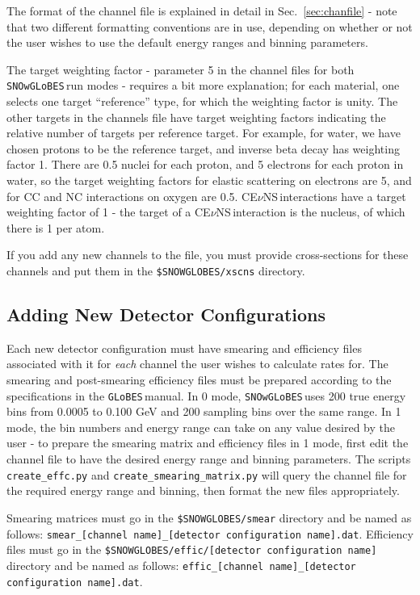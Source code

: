 \documentclass{article}
\newcommand{\cev}{CE$\nu$NS\,}
\newcommand{\snow}{\texttt{SNOwGLoBES}\,}
\newcommand{\glb}{\texttt{GLoBES}\,}
\begin{document}
The format of the channel file is explained in detail in Sec.~\ref{sec:chanfile} - note that two different formatting conventions are in use, depending on whether or not the user wishes to use the default energy ranges and binning parameters.

The target weighting factor - parameter 5 in the channel files for both \snow run modes - requires a bit more explanation; for each material, one selects one target ``reference'' type, for which the weighting factor is unity.  The other targets in the channels file have target weighting factors indicating the relative number of targets per reference target.  For example, for water, we have chosen protons to be the reference target, and inverse beta decay has weighting factor 1. There are 0.5  nuclei for each proton, and 5 electrons for each proton in water, so the target weighting factors for elastic scattering on electrons are 5, and for CC and NC interactions on oxygen are 0.5. \cev interactions have a target weighting factor of 1 - the target of a \cev interaction is the nucleus, of which there is 1 per atom.

If you add any new channels to the file, you must provide cross-sections for these channels and put them in the \texttt{\$SNOWGLOBES/xscns} directory.

\subsection{Adding New Detector Configurations}

Each new detector configuration must have smearing and efficiency files associated with it for \textit{each} channel the user wishes to calculate rates for. The smearing and post-smearing efficiency files must be prepared according to the specifications in the \glb manual. In 0 mode, \snow uses 200 true energy bins from 0.0005 to 0.100 GeV and 200 sampling bins over the same range. In 1 mode, the bin numbers and energy range can take on any value desired by the user - to prepare the smearing matrix and efficiency files in 1 mode, first edit the channel file to have the desired energy range and binning parameters. The scripts \texttt{create\_effc.py} and \texttt{create\_smearing\_matrix.py} will query the channel file for the required energy range and binning, then format the new files appropriately.

Smearing matrices must go in the \texttt{\$SNOWGLOBES/smear} directory and be named as follows: \texttt{smear\_[channel name]\_[detector configuration name].dat}. Efficiency files must go in the \texttt{\$SNOWGLOBES/effic/[detector configuration name]} directory and be named as follows: \texttt{effic\_[channel name]\_[detector configuration name].dat}.
\end{document}
